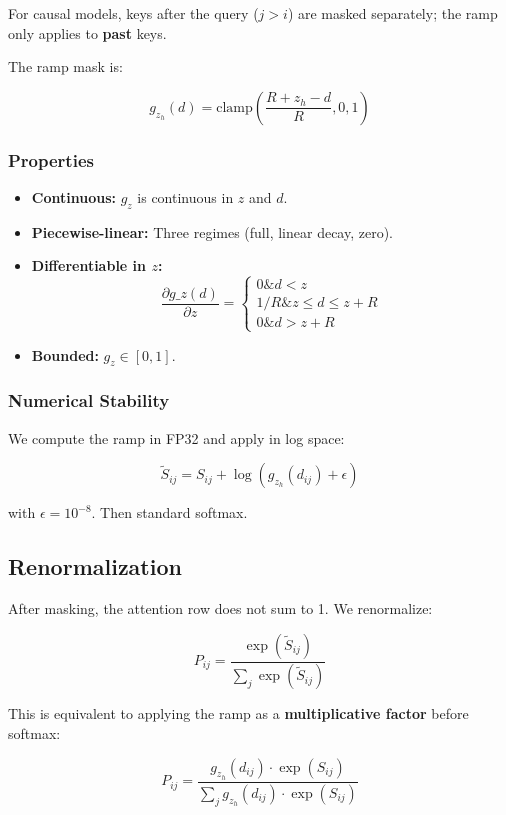 For causal models, keys after the query ($j > i$) are masked separately; 
the ramp only applies to \textbf{past} keys.

The ramp mask is:

\[
g_{z_h}(d) = \text{clamp}\!\left(\frac{R + z_h - d}{R}, 0, 1\right)
\]

\subsubsection{Properties}

\begin{itemize}
\item \textbf{Continuous:} $g_z$ is continuous in $z$ and $d$.
\item \textbf{Piecewise-linear:} Three regimes (full, linear decay, zero).
\item \textbf{Differentiable in $z$:}
  \[
\frac{\partial g\_z(d)}{\partial z} = \begin{cases} 0 \& d < z \\ 1/R \& z \le d \le z + R \\ 0 \& d > z + R \end{cases}
\]
\item \textbf{Bounded:} $g_z \in [0, 1]$.

\end{itemize}
\subsubsection{Numerical Stability}

We compute the ramp in FP32 and apply in log space:

\[
\tilde{S}_{ij} = S_{ij} + \log(g_{z_h}(d_{ij}) + \epsilon)
\]

with $\epsilon = 10^{-8}$. Then standard softmax.

\subsection{Renormalization}

After masking, the attention row does not sum to 1. We renormalize:

\[
P_{ij} = \frac{\exp(\tilde{S}_{ij})}{\sum_j \exp(\tilde{S}_{ij})}
\]

This is equivalent to applying the ramp as a \textbf{multiplicative factor} before 
softmax:

\[
P_{ij} = \frac{g_{z_h}(d_{ij}) \cdot \exp(S_{ij})}{\sum_j g_{z_h}(d_{ij}) \cdot \exp(S_{ij})}
\]

